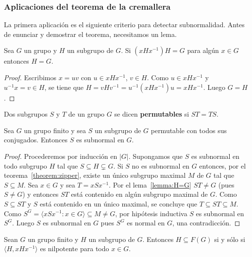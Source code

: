 \subsubsection*{Aplicaciones del teorema de la cremallera}

La primera aplicación es el siguiente criterio para detectar subnormalidad.
Antes de enunciar y demostrar el teorema, necesitamos un lema.

\begin{lemma}
	\label{lemma:H=G}
	Sea $G$ un grupo y $H$ un subgrupo de $G$. Si $(xHx^{-1})H=G$ para algún
	$x\in G$ entonces $H=G$.
\end{lemma}

\begin{proof}
	Escribimos $x=uv$ con $u\in xHx^{-1}$, $v\in H$. Como $u\in xHx^{-1}$ y
	$u^{-1}x=v\in H$, se tiene que 
	$H=vHv^{-1}=u^{-1}(xHx^{-1})u=xHx^{-1}$. Luego 
	$G=H$. 
\end{proof}

Dos subgrupos $S$ y $T$ de un grupo $G$ se dicen \textbf{permutables} si
$ST=TS$. 

\begin{theorem}
	Sea $G$ un grupo finito y sea $S$ un subgrupo de $G$ permutable con todos
	sus conjugados.  Entonces $S$ es subnormal en $G$.
\end{theorem}

\begin{proof}
	Procederemos por inducción en $|G|$. Supongamos que $S$ es subnormal en
	todo subgrupo $H$ tal que $S\subseteq H\subsetneq G$.  Si $S$ no es
	subnormal en $G$ entonces, por el teorema~\ref{theorem:zipper}, existe un
	único subgrupo maximal $M$ de $G$ tal que $S\subseteq M$. Sea $x\in G$ y
	sea $T=xSx^{-1}$. Por el lema~\ref{lemma:H=G} $ST\ne G$ (pues $S\ne G$) y
	entonces $ST$ está contenido en algún subgrupo maximal de $G$. Como
	$S\subseteq ST$ y $S$ está contenido en un único maximal, se concluye que
	$T\subseteq ST\subseteq M$.  Como $S^G=\langle xSx^{-1}:x\in
	G\rangle\subseteq M\ne G$, por hipótesis inductiva $S$ es subnormal en
	$S^G$. Luego $S$ es subnormal en $G$ pues $S^G$ es normal en $G$, una
	contradicción.
\end{proof}

\begin{theorem}[Baer]
	\label{theorem:Baer}
	Sean $G$ un grupo finito y $H$ un subgrupo de $G$. Entonces $H\subseteq
	F(G)$ si y sólo si $\langle H,xHx^{-1}\rangle$ es nilpotente para todo
	$x\in G$.
\end{theorem}


